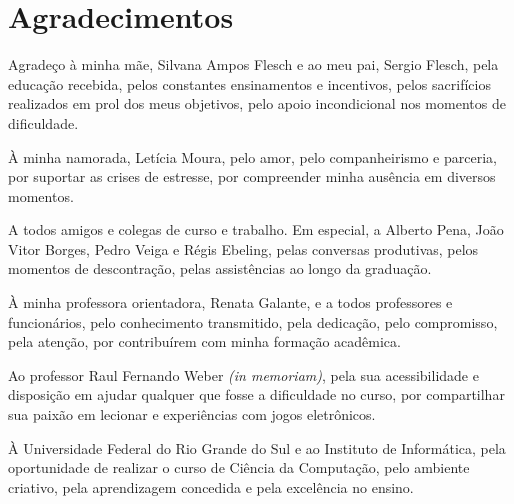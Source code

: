 \chapter*{Agradecimentos}
Agradeço à minha mãe, Silvana Ampos Flesch e ao meu pai, Sergio Flesch, pela educação recebida, pelos constantes ensinamentos e incentivos, pelos sacrifícios realizados em prol dos meus objetivos, pelo apoio incondicional nos momentos de dificuldade.

À minha namorada, Letícia Moura, pelo amor, pelo companheirismo e parceria, por suportar as crises de estresse, por compreender minha ausência em diversos momentos.

A todos amigos e colegas de curso e trabalho. Em especial, a Alberto Pena, João Vitor Borges, Pedro Veiga e Régis Ebeling, pelas conversas produtivas, pelos momentos de descontração, pelas assistências ao longo da graduação.

À minha professora orientadora, Renata Galante, e a todos professores e funcionários, pelo conhecimento transmitido, pela dedicação, pelo compromisso, pela atenção, por contribuírem com minha formação acadêmica.

Ao professor Raul Fernando Weber \textit{(in memoriam)}, pela sua acessibilidade e disposição em ajudar qualquer que fosse a dificuldade no curso, por compartilhar sua paixão em lecionar e experiências com jogos eletrônicos.

À Universidade Federal do Rio Grande do Sul e ao Instituto de Informática, pela oportunidade de realizar o curso de Ciência da Computação, pelo ambiente criativo, pela aprendizagem concedida e pela excelência no ensino.